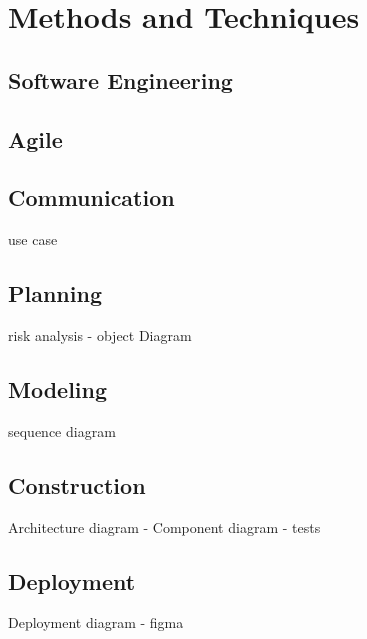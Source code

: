 \chapter{Methods and Techniques}
\section{Software Engineering}
\section{Agile}
\section{Communication}
use case
\section{Planning}
risk analysis - object Diagram
\section{Modeling}
sequence diagram
\section{Construction}
Architecture diagram - Component diagram - tests
\section{Deployment}
Deployment diagram - figma